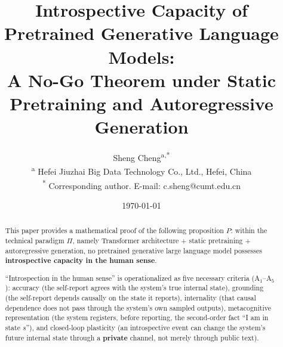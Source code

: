 \documentclass[a4paper]{article}
\title{\bfseries\Large Introspective Capacity of Pretrained Generative Language Models:\\[2pt]
A No-Go Theorem under Static Pretraining and Autoregressive Generation}
\author{Sheng Cheng\textsuperscript{a,*}\\
\normalsize\textsuperscript{a} Hefei Jiuzhai Big Data Technology Co., Ltd., Hefei, China\\
\normalsize\textsuperscript{*} Corresponding author. E-mail: c.sheng@cumt.edu.cn}
\date{\today}
\theoremstyle{cnplain}
\theoremstyle{cndef}
\begin{document}
\maketitle

\begin{abstract}
\noindent This paper provides a mathematical proof of the following proposition $P$:
within the technical paradigm $\Pi$, namely Transformer architecture + static pretraining +
autoregressive generation, no pretrained generative large language model possesses
\textbf{introspective capacity in the human sense}.

\medskip
\noindent ``Introspection in the human sense'' is operationalized as five necessary criteria
($\mathrm{A}_1$--$\mathrm{A}_5$): accuracy (the self-report agrees with the system's true
internal state), grounding (the self-report depends causally on the state it reports),
internality (that causal dependence does not pass through the system's own sampled outputs),
metacognitive representation (the system registers, before reporting, the second-order fact
``I am in state $s$''), and closed-loop plasticity (an introspective event can change the
system's future internal state through a \textbf{private} channel, not merely through public
text).


\end{abstract}
\end{document}
